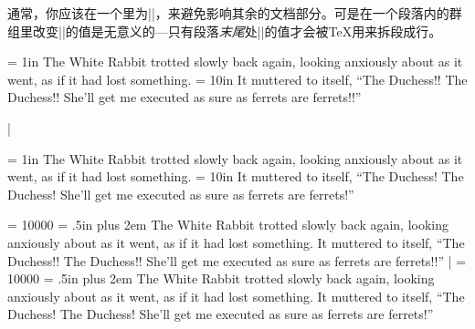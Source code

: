 通常，你应该在一个里为|\leftskip|，来避免影响其余的文档部分。可是在一个段落内的群组里改变|\leftskip|的值是无意义的---只有段落\emph{末尾}处|\leftskip|的值才会被\TeX{}用来拆段成行。

\example
{\leftskip = 1in The White Rabbit trotted slowly back
again, looking anxiously about as it went, as if it had
lost something.  {\leftskip = 10in %
It muttered to itself, ``The Duchess!! The Duchess!! She'll
get me executed as sure as ferrets are ferrets!!''}\par}%
|
\produces
{\leftskip = 1in The White Rabbit trotted slowly back
again, looking anxiously about as it went, as if it had
lost something.  {\leftskip = 10in %
It muttered to itself, ``The Duchess! The Duchess!
She'll get me executed as sure as ferrets are ferrets!''}\par}%
\nextexample
\pretolerance = 10000 %
\rightskip = .5in plus 2em
The White Rabbit trotted slowly back again, looking
anxiously about as it went, as if it had lost something.
It muttered to itself, ``The Duchess!! The Duchess!! She'll
get me executed as sure as ferrets are ferrets!!''
|
\produces
\pretolerance = 10000 %
\rightskip = .5in plus 2em
The White Rabbit trotted slowly back again, looking
anxiously about as it went, as if it had lost something.
It muttered to itself, ``The Duchess! The Duchess! She'll
get me executed as sure as ferrets are ferrets!''
\endexample
\enddesc


